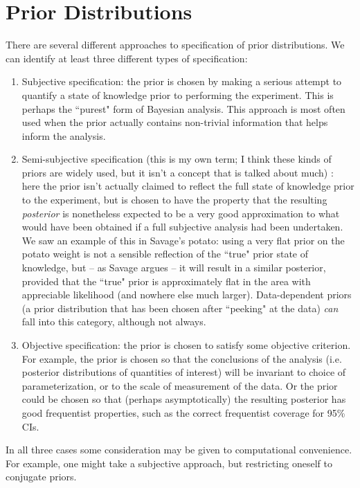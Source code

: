 \documentclass[12pt]{article}
\begin{document}
\section{Prior Distributions}

There are several different approaches to specification of prior distributions. We can identify at least three different types of specification:
\begin{enumerate}
\item Subjective specification: the prior is chosen by making a serious attempt to quantify a state of knowledge prior to performing the experiment. This is perhaps the ``purest" form of Bayesian analysis.
This approach is most often used when the
prior actually contains non-trivial information that helps inform the analysis.
\item Semi-subjective specification (this is my own term; I think these kinds of priors are widely used, but it isn't a concept that is talked about much)
: here the prior isn't actually claimed to reflect the full state of knowledge prior to the experiment, but is chosen to have the property that the resulting {\it posterior} is nonetheless expected to be a very good approximation to what would have been obtained if a full subjective analysis had been undertaken. We saw an example of this in Savage's potato: using a very flat prior on the potato weight is not a sensible reflection of the ``true" prior state of knowledge, but -- as Savage argues -- it will result in a similar posterior, provided that the ``true" prior is approximately flat in the area with appreciable likelihood (and nowhere else much larger). Data-dependent priors (a prior distribution that has been chosen
after ``peeking" at the data) {\it can} fall into this category, although not always.
\item Objective specification: the prior is chosen to satisfy some objective criterion. For example, the prior is chosen so that the conclusions of the analysis (i.e. posterior distributions of quantities of interest) will be invariant to choice of parameterization, or to the scale of measurement of the data. Or the prior could be chosen so that
(perhaps asymptotically) the resulting posterior has good frequentist properties, such as the correct frequentist coverage for 95\% CIs.
\end{enumerate}
In all three cases some consideration may be
given to computational convenience. For example,
one might take a subjective approach, but restricting
oneself to conjugate priors.
\end{document}

